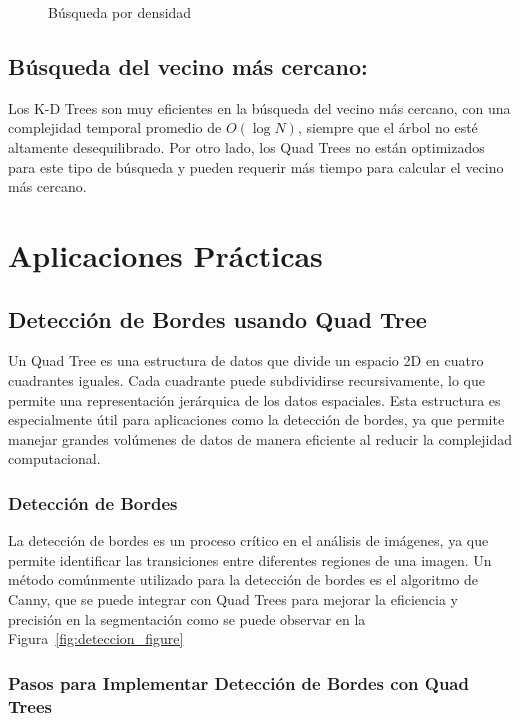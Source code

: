 \documentclass[9pt,a4paper,twoside]{rho-class/rho}
\begin{document}
\begin{itemize}
\begin{figure}[h]
                \caption{Búsqueda por densidad \cite{amay12_spatialsearch}}
                \label{fig:search_p_d_figure}
            \end{figure}
        \end{itemize}
    
    \subsection*{Búsqueda del vecino más cercano:}
        Los K-D Trees son muy eficientes en la búsqueda del vecino más cercano, con una complejidad temporal promedio de $O(\log N)$, siempre que el árbol no esté altamente desequilibrado. Por otro lado, los Quad Trees no están optimizados para este tipo de búsqueda y pueden requerir más tiempo para calcular el vecino más cercano.\\
\section{Aplicaciones Prácticas}
    \subsection[Detección de Bordes usando Quad Tree]{Detección de Bordes usando Quad Tree}

    Un Quad Tree es una estructura de datos que divide un espacio 2D en cuatro cuadrantes iguales. Cada cuadrante puede subdividirse recursivamente, lo que permite una representación jerárquica de los datos espaciales. Esta estructura es especialmente útil para aplicaciones como la detección de bordes, ya que permite manejar grandes volúmenes de datos de manera eficiente al reducir la complejidad computacional.
    
        \subsubsection{Detección de Bordes}
        
        La detección de bordes es un proceso crítico en el análisis de imágenes, ya que permite identificar las transiciones entre diferentes regiones de una imagen. Un método comúnmente utilizado para la detección de bordes es el algoritmo de Canny, que se puede integrar con Quad Trees para mejorar la eficiencia y precisión en la segmentación como se puede observar en la Figura~\ref{fig:deteccion_figure}
        
        \subsubsection{Pasos para Implementar Detección de Bordes con Quad Trees}
        
\end{document}
